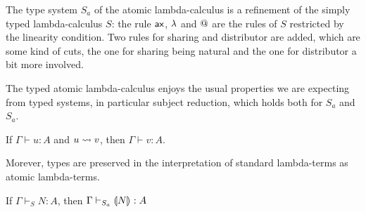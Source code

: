 \documentclass{llncs} %
\begin{document}
The type system $S_a$ of the atomic lambda-calculus is a refinement of the simply typed lambda-calculus $S$: the rule ${\mathsf{ax}}$, ${\lambda}$ and ${@}$ are the rules of $S$ restricted by the linearity condition. Two rules for sharing and distributor are added, which are some kind of cuts, the one for sharing being natural and the one for distributor a bit more involved.


The typed atomic lambda-calculus enjoys the usual properties we are expecting from typed systems, in particular subject reduction, which holds both for ${S_a}$ and  ${S_a}$.


\begin{theorem}
If $\Gamma\vdash u : A$ and $u \rewrite v$, then $\Gamma\vdash v : A$.
\end{theorem}

\noindent
Morever,
types are preserved in the interpretation of standard lambda-terms as atomic lambda-terms.

\begin{proposition}\label{prop:types preserved}
If $\Gamma\vdash_S N:A$, then $\Gamma\vdash_{S_a} {\llparenthesis{N}\rrparenthesis_{{}}}:A$
\end{proposition}


\end{document}
